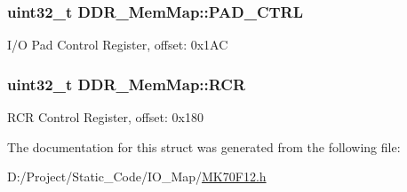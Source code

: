 \subsubsection[{P\+A\+D\+\_\+\+C\+T\+R\+L}]{\setlength{\rightskip}{0pt plus 5cm}uint32\+\_\+t D\+D\+R\+\_\+\+Mem\+Map\+::\+P\+A\+D\+\_\+\+C\+T\+R\+L}\label{struct_d_d_r___mem_map_abeb11d4cc28f5bb277d0cd4a46cb2ce1}
I/\+O Pad Control Register, offset\+: 0x1\+A\+C \hypertarget{struct_d_d_r___mem_map_a46f3bdf0cbb782701ad3edd860cfb667}{}
\subsubsection[{R\+C\+R}]{\setlength{\rightskip}{0pt plus 5cm}uint32\+\_\+t D\+D\+R\+\_\+\+Mem\+Map\+::\+R\+C\+R}\label{struct_d_d_r___mem_map_a46f3bdf0cbb782701ad3edd860cfb667}
R\+C\+R Control Register, offset\+: 0x180 

The documentation for this struct was generated from the following file\+:\begin{DoxyCompactItemize}
\item 
D\+:/\+Project/\+Static\+\_\+\+Code/\+I\+O\+\_\+\+Map/\hyperlink{_m_k70_f12_8h}{M\+K70\+F12.\+h}\end{DoxyCompactItemize}
